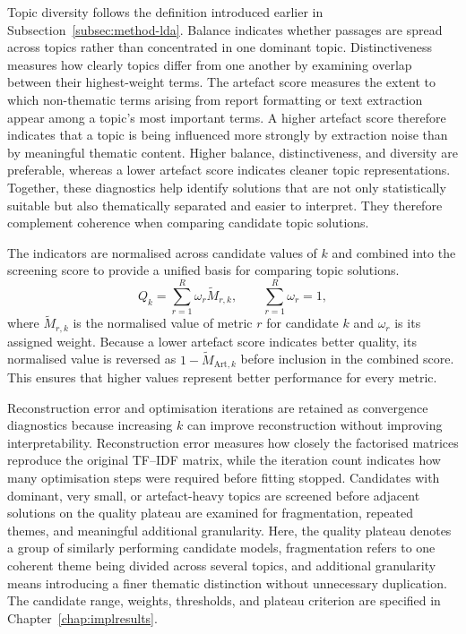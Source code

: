 Topic diversity follows the definition introduced earlier in
Subsection~\ref{subsec:method-lda}. Balance indicates whether passages are spread
across topics rather than concentrated in one dominant topic. Distinctiveness
measures how clearly topics differ from one another by examining overlap between
their highest-weight terms. The artefact score measures the extent to which
non-thematic terms arising from report formatting or text extraction appear among a
topic's most important terms. A higher artefact score therefore indicates that a
topic is being influenced more strongly by extraction noise than by meaningful
thematic content. Higher balance, distinctiveness, and diversity are preferable,
whereas a lower artefact score indicates cleaner topic representations. Together,
these diagnostics help identify solutions that are not only statistically suitable
but also thematically separated and easier to interpret. They therefore complement
coherence when comparing candidate topic solutions.

The indicators are normalised across candidate values of $k$ and combined into the
screening score to provide a unified basis for comparing topic solutions.
\begin{equation}
Q_k
=
\sum_{r=1}^{R}\omega_r\widetilde{M}_{r,k},
\qquad
\sum_{r=1}^{R}\omega_r=1,
\label{eq:method-nmf-selection-score}
\end{equation}
where $\widetilde{M}_{r,k}$ is the normalised value of metric $r$ for candidate $k$
and $\omega_r$ is its assigned weight. Because a lower artefact score indicates
better quality, its normalised value is reversed as
$1-\widetilde{M}_{\mathrm{Art},k}$ before inclusion in the combined score. This
ensures that higher values represent better performance for every metric.

Reconstruction error and optimisation iterations are retained as convergence
diagnostics because increasing $k$ can improve reconstruction without improving
interpretability. Reconstruction error measures how closely the factorised matrices
reproduce the original TF--IDF matrix, while the iteration count indicates how many
optimisation steps were required before fitting stopped. Candidates with dominant,
very small, or artefact-heavy topics are screened before adjacent solutions on the
quality plateau are examined for fragmentation, repeated themes, and meaningful
additional granularity. Here, the quality plateau denotes a group of similarly
performing candidate models, fragmentation refers to one coherent theme being divided
across several topics, and additional granularity means introducing a finer thematic
distinction without unnecessary duplication. The candidate range, weights,
thresholds, and plateau criterion are specified in Chapter~\ref{chap:implresults}.

